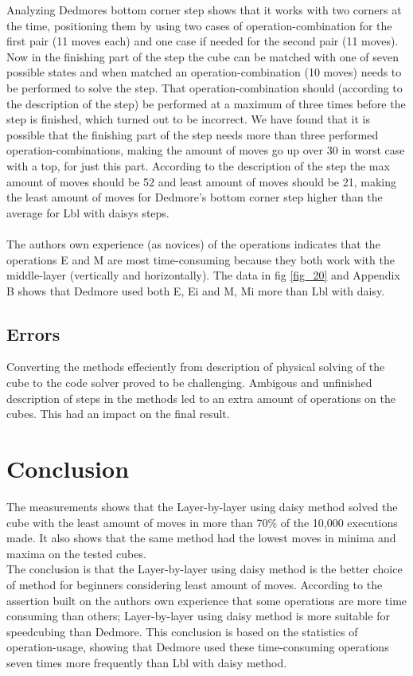 \documentclass[a4paper,11pt]{kth-mag}
\begin{document}
Analyzing Dedmores bottom corner step shows that it works with two corners at the time, positioning them by using two cases of operation-combination for the first pair (11 moves each) and one case if needed for the second pair (11 moves). Now in the finishing part of the step the cube can be matched with one of seven possible states and when matched an operation-combination (10 moves) needs to be performed to solve the step. That operation-combination should (according to the description of the step) be performed at a maximum of three times before the step is finished, which turned out to be incorrect. We have found that it is possible that the finishing part of the step needs more than three performed operation-combinations, making the amount of moves go up over 30 in worst case with a top, for just this part. According to the description of the step the max amount of moves should be 52 and least amount of moves should be 21, making the least amount of moves for Dedmore's bottom corner step higher than the average for Lbl with daisys steps.\\\\   
The authors own experience (as novices) of the operations indicates that the operations E and M are most time-consuming because they both work with the middle-layer (vertically and horizontally). The data in fig \ref{fig_20} and Appendix B shows that Dedmore used both E, Ei and M, Mi more than Lbl with daisy. 		     


\section{Errors}
Converting the methods effeciently from description of physical solving of the cube to the code solver proved to be challenging. Ambigous and unfinished description of steps in the methods led to an extra amount of operations on the cubes. This had an impact on the final result.

\chapter{Conclusion}
The measurements shows that the Layer-by-layer using daisy method solved the cube with the least amount of moves in more than 70\% of the 10,000 executions made. It also shows that the same method had the lowest moves in minima and maxima on the tested cubes.\\ The conclusion is that the Layer-by-layer using daisy method is the better choice of method for beginners considering least amount of moves. 
According to the assertion built on the authors own experience that some operations are more time consuming than others; Layer-by-layer using daisy method is more suitable for speedcubing than Dedmore. This conclusion is based on the statistics of operation-usage, showing that Dedmore used these time-consuming operations seven times more frequently than Lbl with daisy method.
\end{document}
